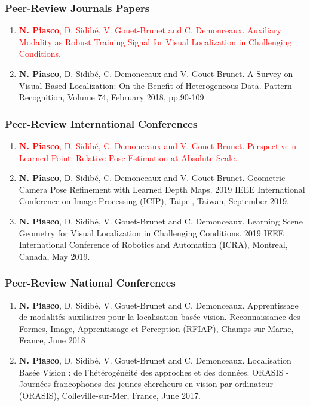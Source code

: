 \begin{publication}

\subsubsection*{Peer-Review Journals Papers}

\begin{enumerate}\scriptsize
	\item \textcolor{red}{\textbf{N. Piasco}, D. Sidib\'e, V. Gouet-Brunet and C. Demonceaux. Auxiliary Modality as Robust Training Signal for
Visual Localization in Challenging Conditions.}
	\item \textbf{N. Piasco}, D. Sidib\'e, C. Demonceaux and V. Gouet-Brunet. A Survey on Visual-Based Localization: On the Benefit of Heterogeneous Data. Pattern Recognition, Volume 74, February 2018, pp.90-109.
\end{enumerate}

\subsubsection*{Peer-Review International Conferences}

\begin{enumerate}\scriptsize
	\item \textcolor{red}{\textbf{N. Piasco}, D. Sidib\'e, C. Demonceaux and V. Gouet-Brunet. Perspective-n-Learned-Point: Relative Pose
Estimation at Absolute Scale.}
	\item \textbf{N. Piasco}, D. Sidib\'e, C. Demonceaux and V. Gouet-Brunet. Geometric Camera Pose Refinement with Learned Depth Maps. 2019 IEEE International Conference on Image Processing (ICIP), Taipei, Taiwan, September 2019.
	\item \textbf{N. Piasco}, D. Sidib\'e, V. Gouet-Brunet and C. Demonceaux. Learning Scene Geometry for Visual Localization in Challenging Conditions. 2019 IEEE International Conference of Robotics and Automation (ICRA), Montreal, Canada, May 2019.	
\end{enumerate}

\subsubsection*{Peer-Review National Conferences}

\begin{enumerate}\scriptsize
	\item \textbf{N. Piasco}, D. Sidib\'e, V. Gouet-Brunet and C. Demonceaux. Apprentissage de modalit\'es auxiliaires pour la localisation bas\'ee vision. Reconnaissance des Formes, Image, Apprentissage et Perception (RFIAP), Champs-sur-Marne, France, June 2018
	\item \textbf{N. Piasco}, D. Sidib\'e, V. Gouet-Brunet and C. Demonceaux. Localisation Bas\'ee Vision : de l’h\'et\'erog\'en\'eit\'e des approches et des données. ORASIS - Journ\'ees francophones des jeunes chercheurs en vision par ordinateur (ORASIS), Colleville-sur-Mer, France, June 2017.
\end{enumerate}


\end{publication}
